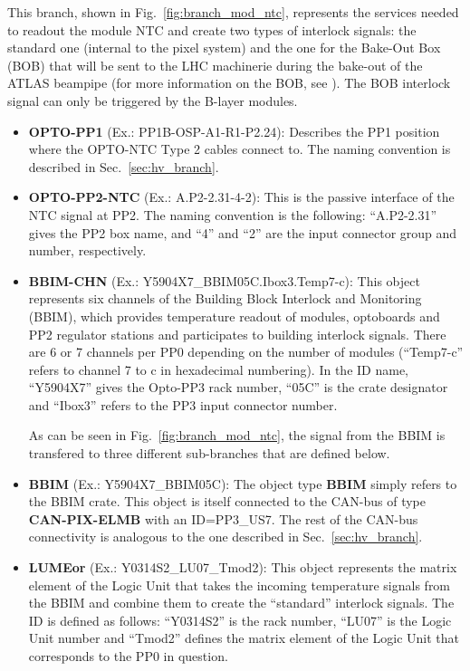 This branch, shown in Fig.~\ref{fig:branch_mod_ntc}, represents the services needed to readout 
the module NTC and create two types of interlock signals: the standard one (internal to the 
pixel system) and the one for the Bake-Out Box (BOB) that will be sent to the LHC machinerie
during the bake-out of the ATLAS beampipe (for more information on the BOB, see 
\cite{ilock_matrix}). The BOB interlock signal can only be triggered by the B-layer modules.
%
%
\begin{itemize}
\item {\bf OPTO-PP1} (Ex.: PP1B-OSP-A1-R1-P2.24): Describes the PP1 position where the OPTO-NTC Type 2 
cables connect to. The naming convention is described in Sec.~\ref{sec:hv_branch}.
\item {\bf OPTO-PP2-NTC} (Ex.: A.P2-2.31-4-2): This is the passive interface of the NTC signal at PP2. 
The naming convention is the following: ``A.P2-2.31'' gives the PP2 box name, and ``4'' and ``2''
are the input connector group and number, respectively.
\item {\bf BBIM-CHN} (Ex.: Y5904X7\_BBIM05C.Ibox3.Temp7-c): This object represents six channels of the 
Building Block Interlock and Monitoring (BBIM), which provides temperature readout of modules,
optoboards and PP2 regulator stations and participates to building interlock signals. There are 
6 or 7 channels per PP0 depending on the number of modules (``Temp7-c'' refers
to channel 7 to c in hexadecimal numbering).  In the ID name, ``Y5904X7'' gives
the Opto-PP3 rack number, ``05C'' is the crate designator and ``Ibox3'' refers to the PP3 input
connector number.

As can be seen in Fig.~\ref{fig:branch_mod_ntc}, the signal from the BBIM is transfered to three 
different sub-branches that are defined below.

\item {\bf BBIM} (Ex.: Y5904X7\_BBIM05C): The object type {\bf BBIM} simply refers to the BBIM crate. This object
is itself connected to the CAN-bus of type {\bf CAN-PIX-ELMB} with an ID=PP3\_US7. 
The rest of the CAN-bus connectivity is analogous to the one described in Sec.~\ref{sec:hv_branch}.

\item {\bf LUMEor} (Ex.: Y0314S2\_LU07\_Tmod2): This object represents the matrix element of the Logic Unit that
takes the incoming temperature signals from the BBIM and combine them to create the ``standard'' interlock 
signals. The ID is defined as follows: ``Y0314S2'' is the rack number, ``LU07'' is the Logic Unit
number and ``Tmod2'' defines the matrix element of the Logic Unit that corresponds to the PP0 in 
question.


\end{itemize}
